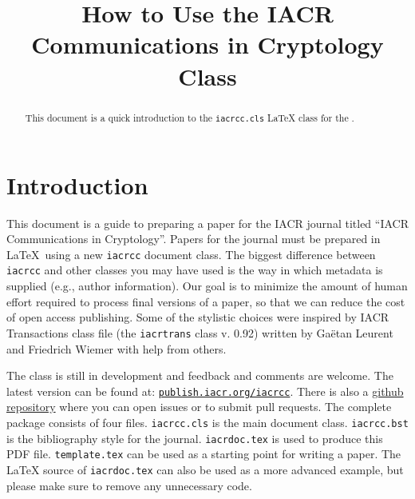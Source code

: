 \documentclass{iacrcc}
\title[running  = {The iacrcc class},
       onclick  = {https://github.com/IACR/latex},
       subtitle = {LaTeX Class Documentation (v0.10)},
      ]
      {How to Use the IACR Communications in Cryptology Class}
\affiliation[ror      = 031v4g827,
             onclick  = {https://www.nxp.com},
             street   = {Interleuvenlaan 80},
             city     = {Leuven},
             postcode = {3001},
             country  = {Belgium}
            ]{NXP Semiconductors}
\affiliation{Self}
\begin{document}
\maketitle


\begin{abstract}
  This document is a quick introduction to the \texttt{iacrcc.cls}
  \LaTeX{} class for the \publname{}.
\end{abstract}

\tableofcontents{}

\section*{Introduction}

This document is a guide to preparing a paper for the IACR journal
titled ``IACR Communications in Cryptology''.  Papers for the journal
must be prepared in \LaTeX\ using a new \texttt{iacrcc} document
class. The biggest difference between \texttt{iacrcc} and other
classes you may have used is the way in which metadata is supplied
(e.g., author information). Our goal is to minimize the amount of
human effort required to process final versions of a paper, so that we
can reduce the cost of open access publishing.  Some of the stylistic
choices were inspired by IACR Transactions class file (the
\texttt{iacrtrans} class v. 0.92) written by Ga{\"e}tan Leurent and
Friedrich Wiemer with help from others.

The class is still in development and feedback and comments are
welcome.  The latest version can be found at:
\href{https://publish.iacr.org/iacrcc}{\texttt{publish.iacr.org/iacrcc}}.
There is also a \href{https://github.com/IACR/latex}{github
  repository} where you can open issues or to submit pull requests.
The complete package consists of four files. \texttt{iacrcc.cls} is
the main document class. \texttt{iacrcc.bst} is the bibliography style
for the journal.  \texttt{iacrdoc.tex} is used to produce this PDF
file. \texttt{template.tex} can be used as a starting point for
writing a paper.  The \LaTeX{} source of \texttt{iacrdoc.tex} can also
be used as a more advanced example, but please make sure to remove any
unnecessary code.
\end{document}
